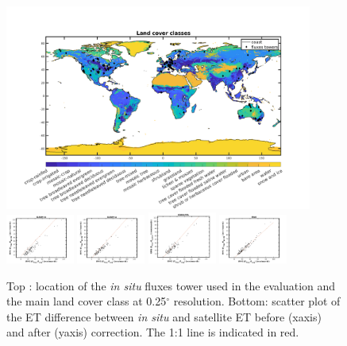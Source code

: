 \documentclass[draft]{agujournal2019}
\begin{document}
\begin{figure}[h]
\centering
\includegraphics[width=0.9\textwidth]{LCC_025.png}
\includegraphics[width=0.2\textwidth]{squatter_rmse1.png}
\includegraphics[width=0.2\textwidth]{squatter_rmse2.png}
\includegraphics[width=0.2\textwidth]{squatter_rmse3.png}
\includegraphics[width=0.2\textwidth]{squatter_rmse4.png}
\caption{Top : location of the {\it in situ} fluxes tower used in the evaluation and the main land cover class at 0.25$^\circ$ resolution. Bottom: scatter plot of the ET difference between {\it in situ} and satellite ET before (xaxis) and after (yaxis) correction. The 1:1 line is indicated in red.}
\end{figure}
\end{document}
